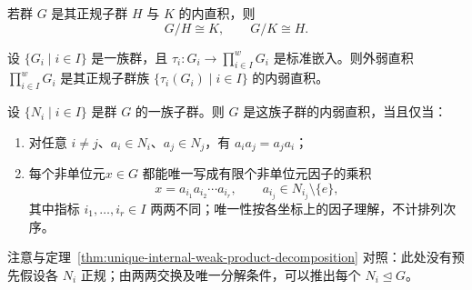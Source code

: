 \begin{proposition}\label{prop:quotient-of-internal-direct-product}
若群 $G$ 是其正规子群 $H$ 与 $K$ 的内直积，则
\[
  G/H\cong K,
  \qquad
  G/K\cong H.
\]
\end{proposition}

\begin{proposition}\label{prop:weak-product-internal-sum}
设 $\{G_i\mid i\in I\}$ 是一族群，且 $\tau_i:G_i\to\prod\nolimits_{i\in I}^{w}G_i$ 是标准嵌入。则外弱直积 $\prod\nolimits_{i\in I}^{w}G_i$ 是其正规子群族 $\{\tau_i(G_i)\mid i\in I\}$ 的内弱直积。
\end{proposition}

\begin{proposition}\label{prop:internal-weak-product-criterion}
设 $\{N_i\mid i\in I\}$ 是群 $G$ 的一族子群。则 $G$ 是这族子群的内弱直积，当且仅当：
\begin{enumerate}[label=(\arabic*)]
  \item 对任意 $i\neq j$、$a_i\in N_i$、$a_j\in N_j$，有 $a_ia_j=a_ja_i$；
  \item 每个非单位元$x\in G$ 都能唯一写成有限个非单位元因子的乘积
  \[
    x=a_{i_1}a_{i_2}\cdots a_{i_r},
    \qquad a_{i_j}\in N_{i_j}\setminus\{e\},
  \]
  其中指标 $i_1,\ldots,i_r\in I$ 两两不同；唯一性按各坐标上的因子理解，不计排列次序。
\end{enumerate}
\end{proposition}

\begin{purplenote}
注意与定理~\ref{thm:unique-internal-weak-product-decomposition} 对照：此处没有预先假设各 $N_i$ 正规；由两两交换及唯一分解条件，可以推出每个 $N_i\trianglelefteq G$。
\end{purplenote}

